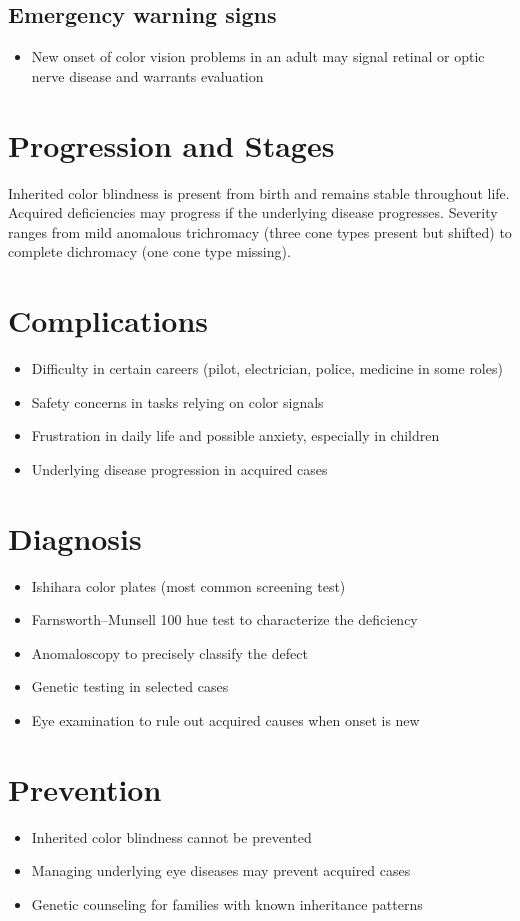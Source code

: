 \subsection{Emergency warning signs}
\begin{itemize}[noitemsep]
  \item New onset of color vision problems in an adult may signal retinal or optic nerve disease and warrants evaluation
\end{itemize}
\section{Progression and Stages}
Inherited color blindness is present from birth and remains stable throughout life. Acquired deficiencies may progress if the underlying disease progresses. Severity ranges from mild anomalous trichromacy (three cone types present but shifted) to complete dichromacy (one cone type missing).
\section{Complications}
\begin{itemize}[noitemsep]
  \item Difficulty in certain careers (pilot, electrician, police, medicine in some roles)
  \item Safety concerns in tasks relying on color signals
  \item Frustration in daily life and possible anxiety, especially in children
  \item Underlying disease progression in acquired cases
\end{itemize}
\section{Diagnosis}
\begin{itemize}[noitemsep]
  \item Ishihara color plates (most common screening test)
  \item Farnsworth--Munsell 100 hue test to characterize the deficiency
  \item Anomaloscopy to precisely classify the defect
  \item Genetic testing in selected cases
  \item Eye examination to rule out acquired causes when onset is new
\end{itemize}
\section{Prevention}
\begin{itemize}[noitemsep]
  \item Inherited color blindness cannot be prevented
  \item Managing underlying eye diseases may prevent acquired cases
  \item Genetic counseling for families with known inheritance patterns
\end{itemize}
